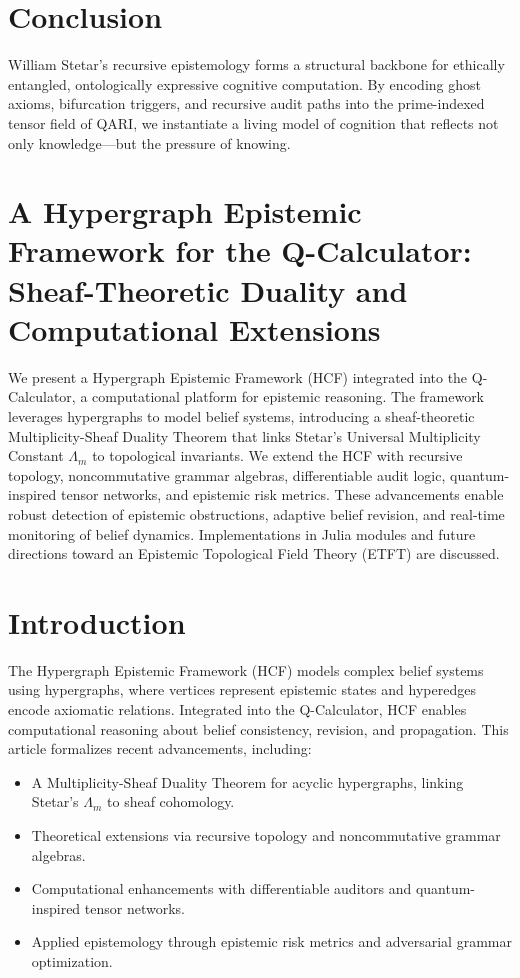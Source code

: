 \documentclass[12pt]{article}
\begin{document}
\section{Conclusion}

William Stetar’s recursive epistemology forms a structural backbone for ethically entangled, ontologically expressive cognitive computation. By encoding ghost axioms, bifurcation triggers, and recursive audit paths into the prime-indexed tensor field of QARI, we instantiate a living model of cognition that reflects not only knowledge—but the pressure of knowing.

\section{A Hypergraph Epistemic Framework for the Q-Calculator: Sheaf-Theoretic Duality and Computational Extensions}

We present a Hypergraph Epistemic Framework (HCF) integrated into the Q-Calculator, a computational platform for epistemic reasoning. The framework leverages hypergraphs to model belief systems, introducing a sheaf-theoretic Multiplicity-Sheaf Duality Theorem that links Stetar's Universal Multiplicity Constant \(\Lambda_m\) to topological invariants. We extend the HCF with recursive topology, noncommutative grammar algebras, differentiable audit logic, quantum-inspired tensor networks, and epistemic risk metrics. These advancements enable robust detection of epistemic obstructions, adaptive belief revision, and real-time monitoring of belief dynamics. Implementations in Julia modules and future directions toward an Epistemic Topological Field Theory (ETFT) are discussed.


\section{Introduction}
The Hypergraph Epistemic Framework (HCF) models complex belief systems using hypergraphs, where vertices represent epistemic states and hyperedges encode axiomatic relations. Integrated into the Q-Calculator, HCF enables computational reasoning about belief consistency, revision, and propagation. This article formalizes recent advancements, including:

\begin{itemize}
    \item A Multiplicity-Sheaf Duality Theorem for acyclic hypergraphs, linking Stetar's \(\Lambda_m\) to sheaf cohomology.
    \item Theoretical extensions via recursive topology and noncommutative grammar algebras.
    \item Computational enhancements with differentiable auditors and quantum-inspired tensor networks.
    \item Applied epistemology through epistemic risk metrics and adversarial grammar optimization.
\end{itemize}
\end{document}
